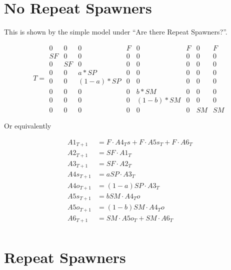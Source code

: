 \documentclass{report}
\begin{document}
\section{No Repeat Spawners}
This is shown by the simple model under ``Are there Repeat
Spawners?''.   

\[
 T = 
  \begin{matrix}
                  0&0&0&F&0&F&0&F\\
                  SF&0&0&0&0&0&0&0\\
                  0&SF&0&0&0&0&0&0\\
                  0&0&a*SP&0&0&0&0&0\\
                  0&0&(1-a)*SP&0&0&0&0&0\\
                  0&0&0&0& b*SM&0&0&0\\
                  0&0&0&0& (1-b)*SM&0&0&0\\
                  0&0&0&0&0&0&SM&SM

  \end{matrix}
\]

Or equivalently

\begin{align*} 
  A1_{T+1}&=F \cdot A4_Ts+F \cdot A5s_T+F \cdot A6_T\\
  A2_{T+1}&=SF \cdot A1_T\\
  A3_{T+1}&=SF \cdot A2_T\\
  A4s_{T+1}&=aSP \cdot A3_T\\
  A4o_{T+1}&=(1-a)SP \cdot A3_T\\
  A5s_{T+1}&=bSM \cdot A4_To\\
  A5o_{T+1}&=(1-b)SM \cdot A4_To\\
  A6_{T+1}&=SM \cdot A5o_T+SM \cdot A6_T\\
\end{align*}




\section{Repeat Spawners}
\end{document}
